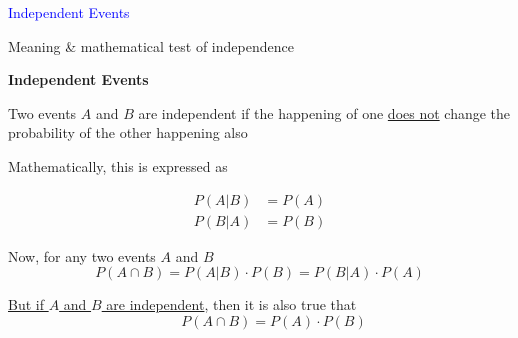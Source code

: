 \documentclass[14pt,fleqn]{extarticle}
\begin{document}
\begin{skill}
    \begin{narrow}
\textcolor{blue}{Independent Events}

Meaning \& mathematical test of independence
         
    \end{narrow}
    
    \reason 
    
    \textbf{Independent Events}

Two events $A$ and $B$ are independent if the happening of one \underline{does not} change the probability of the other happening also\newline 

Mathematically, this is expressed as 

\begin{align}
	P \left(A\vert B \right) &= P(A) \\ 
	P \left(B\vert A \right) &= P(B)
\end{align}


Now, for any two events $A$ and $B$
\small\[P \left(A\cap B \right) = P \left(A\vert B \right)\cdot P(B) = P \left(B\vert A \right)\cdot P(A)\]\normalsize

\underline{But if $A$ and $B$ are independent}, then it is also true that 
\[ \qquad P \left(A\cap B \right) = P(A) \cdot P(B)\]

\end{skill}
\end{document}
